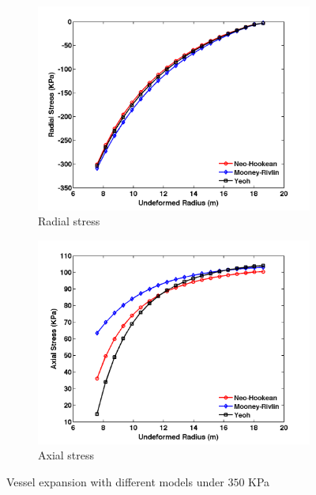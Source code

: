 \begin{figure}[H]
	\begin{subfigure}[b]{0.5\textwidth}
		\centering
		\includegraphics[width=\textwidth]{./figures/radial_models.png}
		\caption{Radial stress}
		\label{radial_models}
	\end{subfigure}
	\begin{subfigure}[b]{0.5\textwidth}
		\centering
		\includegraphics[width=\textwidth]{./figures/axial_models.png}
		\caption{Axial stress}
		\label{axial_models}
	\end{subfigure}
	\caption{Vessel expansion with different models under $350$ KPa}
	\label{fig:models}
\end{figure}

